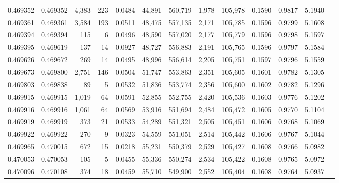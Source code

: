 \begin{tabular}{rrrrrrrrrrrrr}
0.469352 & 0.469352 & 4,383 &   223 &                                     0.0484 &  44,891 & 560,719 &   1,978 & 105,978 & 0.1590 & 0.9817 & 5.1940 \\
0.469361 & 0.469361 & 3,584 &   193 &                                     0.0511 &  48,475 & 557,135 &   2,171 & 105,785 & 0.1596 & 0.9799 & 5.1608 \\
0.469394 & 0.469394 &   115 &     6 &                                     0.0496 &  48,590 & 557,020 &   2,177 & 105,779 & 0.1596 & 0.9798 & 5.1597 \\
0.469395 & 0.469619 &   137 &    14 &                                     0.0927 &  48,727 & 556,883 &   2,191 & 105,765 & 0.1596 & 0.9797 & 5.1584 \\
0.469626 & 0.469672 &   269 &    14 &                                     0.0495 &  48,996 & 556,614 &   2,205 & 105,751 & 0.1597 & 0.9796 & 5.1559 \\
0.469673 & 0.469800 & 2,751 &   146 &                                     0.0504 &  51,747 & 553,863 &   2,351 & 105,605 & 0.1601 & 0.9782 & 5.1305 \\
0.469803 & 0.469838 &    89 &     5 &                                     0.0532 &  51,836 & 553,774 &   2,356 & 105,600 & 0.1602 & 0.9782 & 5.1296 \\
0.469915 & 0.469915 & 1,019 &    64 &                                     0.0591 &  52,855 & 552,755 &   2,420 & 105,536 & 0.1603 & 0.9776 & 5.1202 \\
0.469916 & 0.469916 & 1,061 &    64 &                                     0.0569 &  53,916 & 551,694 &   2,484 & 105,472 & 0.1605 & 0.9770 & 5.1104 \\
0.469919 & 0.469919 &   373 &    21 &                                     0.0533 &  54,289 & 551,321 &   2,505 & 105,451 & 0.1606 & 0.9768 & 5.1069 \\
0.469922 & 0.469922 &   270 &     9 &                                     0.0323 &  54,559 & 551,051 &   2,514 & 105,442 & 0.1606 & 0.9767 & 5.1044 \\
0.469965 & 0.470015 &   672 &    15 &                                     0.0218 &  55,231 & 550,379 &   2,529 & 105,427 & 0.1608 & 0.9766 & 5.0982 \\
0.470053 & 0.470053 &   105 &     5 &                                     0.0455 &  55,336 & 550,274 &   2,534 & 105,422 & 0.1608 & 0.9765 & 5.0972 \\
0.470096 & 0.470108 &   374 &    18 &                                     0.0459 &  55,710 & 549,900 &   2,552 & 105,404 & 0.1608 & 0.9764 & 5.0937 \\

\end{tabular}
